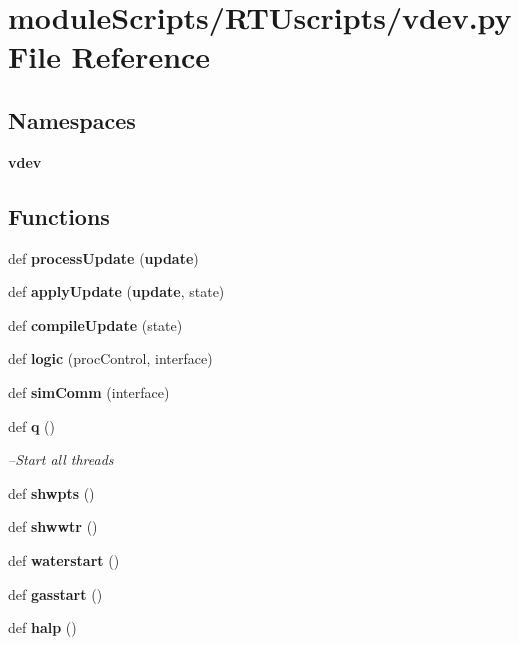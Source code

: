 \section{module\+Scripts/\+R\+T\+Uscripts/vdev.py File Reference}
\label{vdev_8py}
\subsection*{Namespaces}
\begin{DoxyCompactItemize}
\item 
 {\bf vdev}
\end{DoxyCompactItemize}
\subsection*{Functions}
\begin{DoxyCompactItemize}
\item 
def {\bf process\+Update} ({\bf update})
\item 
def {\bf apply\+Update} ({\bf update}, state)
\item 
def {\bf compile\+Update} (state)
\item 
def {\bf logic} (proc\+Control, interface)
\item 
def {\bf sim\+Comm} (interface)
\item 
def {\bf q} ()
\begin{DoxyCompactList}\small\item\em --Start all threads \end{DoxyCompactList}\item 
def {\bf shwpts} ()
\item 
def {\bf shwwtr} ()
\item 
def {\bf waterstart} ()
\item 
def {\bf gasstart} ()
\item 
def {\bf halp} ()
\end{DoxyCompactItemize}
